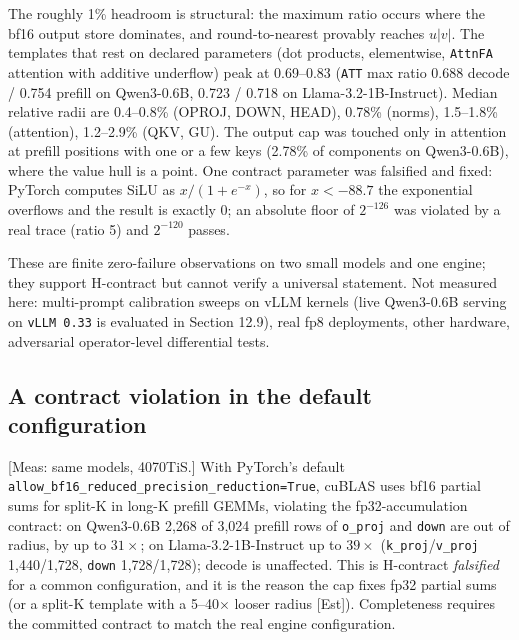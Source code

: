 \documentclass[10pt]{article}
\begin{document}
The roughly 1\% headroom is structural: the maximum ratio occurs where the bf16 output store dominates, and round-to-nearest provably reaches $u\lvert v\rvert$. The templates that rest on declared parameters (dot products, elementwise, \texttt{AttnFA} attention with additive underflow) peak at 0.69--0.83 (\texttt{ATT} max ratio 0.688 decode / 0.754 prefill on Qwen3-0.6B, 0.723 / 0.718 on Llama-3.2-1B-Instruct). Median relative radii are 0.4--0.8\% (OPROJ, DOWN, HEAD), 0.78\% (norms), 1.5--1.8\% (attention), 1.2--2.9\% (QKV, GU). The output cap was touched only in attention at prefill positions with one or a few keys (2.78\% of components on Qwen3-0.6B), where the value hull is a point. One contract parameter was falsified and fixed: PyTorch computes SiLU as $x/(1+e^{-x})$, so for $x<-88.7$ the exponential overflows and the result is exactly 0; an absolute floor of $2^{-126}$ was violated by a real trace (ratio 5) and $2^{-120}$ passes.

These are finite zero-failure observations on two small models and one engine; they support H-contract but cannot verify a universal statement. Not measured here: multi-prompt calibration sweeps on vLLM kernels (live Qwen3-0.6B serving on \texttt{vLLM 0.\allowbreak{}33} is evaluated in Section 12.9), real fp8 deployments, other hardware, adversarial operator-level differential tests.

\subsection{A contract violation in the default configuration}
[Meas: same models, 4070TiS.] With PyTorch's default \texttt{allow\_\allowbreak{}bf16\_\allowbreak{}reduced\_\allowbreak{}precision\_\allowbreak{}reduction=True}, cuBLAS uses bf16 partial sums for split-K in long-K prefill GEMMs, violating the fp32-accumulation contract: on Qwen3-0.6B 2,268 of 3,024 prefill rows of \texttt{o\_\allowbreak{}proj} and \texttt{down} are out of radius, by up to $31\times$; on Llama-3.2-1B-Instruct up to $39\times$ (\texttt{k\_\allowbreak{}proj}/\texttt{v\_\allowbreak{}proj} 1,440/1,728, \texttt{down} 1,728/1,728); decode is unaffected. This is H-contract \emph{falsified} for a common configuration, and it is the reason the cap fixes fp32 partial sums (or a split-K template with a 5--40$\times$ looser radius [Est]). Completeness requires the committed contract to match the real engine configuration.
\end{document}
